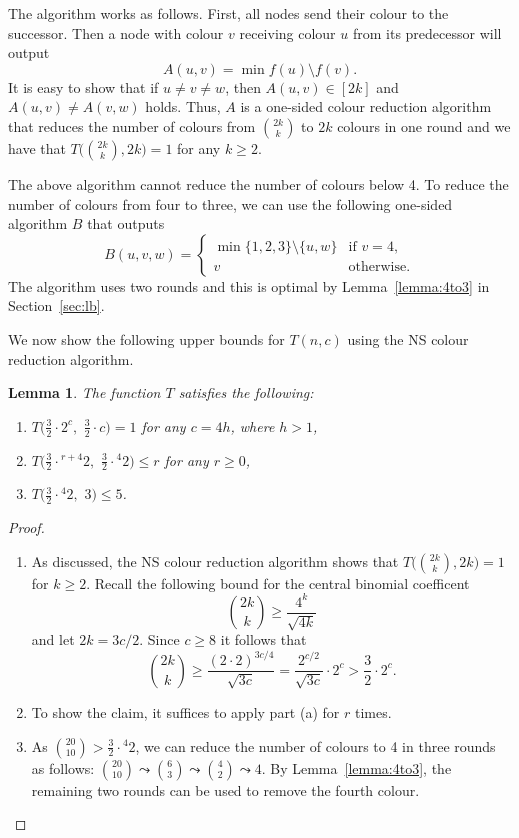 \documentclass[a4paper,11pt]{article}
\newtheorem{lemma}[theorem]{Lemma}
\theoremstyle{remark}
\newcommand{\pt}[1]{{}^{#1}2} \newcommand{\nh}{\sim} \DeclareMathOperator{\indeg}{in-deg}
\begin{document}
The algorithm works as follows. First, all nodes send their colour to the successor. Then a node with colour $v$ receiving colour $u$ from its predecessor will output
\[
 A(u,v) = \min f(u) \setminus f(v).
\]
It is easy to show that if $u \neq v \neq w$, then $A(u,v) \in [2k]$ and $A(u,v) \neq A(v,w)$ holds. Thus, $A$ is a one-sided colour reduction algorithm that reduces the number of colours from ${2k \choose k}$ to $2k$ colours in one round and we have that $T\bigl({2k \choose k}, 2k\bigr) = 1$ for any $k \ge 2$.

The above algorithm cannot reduce the number of colours below 4. To reduce the number of colours from four to three, we can use the following one-sided algorithm $B$ that outputs
\[
 B(u,v,w) = \begin{cases}
              \min \{1,2,3\} \setminus \{u,w\} &\text{if } v = 4, \\
              v & \text{otherwise}.
            \end{cases}
\]
The algorithm uses two rounds and this is optimal by Lemma~\ref{lemma:4to3} in Section~\ref{sec:lb}.

We now show the following upper bounds for $T(n,c)$ using the NS colour reduction algorithm.

\begin{lemma}\label{lemma:ns}
 The function $T$ satisfies the following:
 \begin{enumerate}[label=(\alph*)]
  \item $T\bigl(\frac{3}{2} \cdot 2^c,\,\, \frac{3}{2} \cdot c \bigr) = 1$ for any $c = 4h$, where $h > 1$, 
  \item $T\bigl(\frac{3}{2} \cdot \pt{r+4},\,\, \frac{3}{2} \cdot \pt {4} \bigr) \le r$ for any $r \ge 0$,
  \item $T\bigl(\frac{3}{2} \cdot \pt{4},\,\, 3 \bigr) \le 5$.
 \end{enumerate}
\end{lemma}
\begin{proof}\mbox{}
 \begin{enumerate}[label=(\alph*)]
 \item As discussed, the NS colour reduction algorithm shows that $T\bigl( {2k \choose k}, 2k \bigr) = 1$ for $k \ge 2$. Recall the following bound for the central binomial coefficent
\[
 {2k \choose k} \ge \frac{4^k}{\sqrt{4k}}
\]
and let $2k = 3c/2$. Since $c \ge 8$ it follows that 
\[
{2k \choose k } \ge \frac{(2\cdot2)^{3c/4}}{\sqrt{3c}} = \frac{2^{c/2}}{\sqrt{3c}} \cdot 2^c > \frac{3}{2} \cdot 2^c.
\]

 \item To show the claim, it suffices to apply part (a) for $r$ times. 

 \item As ${20 \choose 10} > \frac{3}{2} \cdot \pt{4}$, we can reduce the number of colours to 4 in three rounds as follows: ${20 \choose 10} \leadsto {6 \choose 3} \leadsto {4 \choose 2} \leadsto 4$. By Lemma~\ref{lemma:4to3}, the remaining two rounds can be used to remove the fourth colour. \qedhere
 \end{enumerate}
\end{proof}
\end{document}
